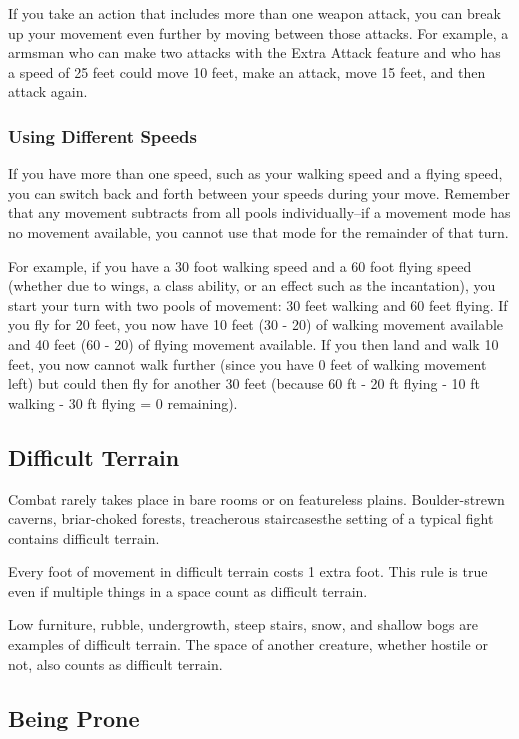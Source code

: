If you take an action that includes more than one weapon attack, you can break up your movement even further by moving between those attacks. For example, a armsman who can make two attacks with the Extra Attack feature and who has a speed of 25 feet could move 10 feet, make an attack, move 15 feet, and then attack again.

\subsubsection{Using Different Speeds}

If you have more than one speed, such as your walking speed and a flying speed, you can switch back and forth between your speeds during your move. Remember that any movement subtracts from all pools individually--if a movement mode has no movement available, you cannot use that mode for the remainder of that turn.

For example, if you have a 30 foot walking speed and a 60 foot flying speed (whether due to wings, a class ability, or an effect such as the  incantation), you start your turn with two pools of movement: 30 feet walking and 60 feet flying. If you fly for 20 feet, you now have 10 feet (30 - 20) of walking movement available and 40 feet (60 - 20) of flying movement available. If you then land and walk 10 feet, you now cannot walk further (since you have 0 feet of walking movement left) but could then fly for another 30 feet (because 60 ft - 20 ft flying - 10 ft walking - 30 ft flying = 0 remaining).

\subsection{Difficult Terrain}

Combat rarely takes place in bare rooms or on featureless plains. Boulder-strewn caverns, briar-choked forests, treacherous staircases\textemdash the setting of a typical fight contains difficult terrain.

Every foot of movement in difficult terrain costs 1 extra foot. This rule is true even if multiple things in a space count as difficult terrain.

Low furniture, rubble, undergrowth, steep stairs, snow, and shallow bogs are examples of difficult terrain. The space of another creature, whether hostile or not, also counts as difficult terrain.

\subsection{Being Prone}

